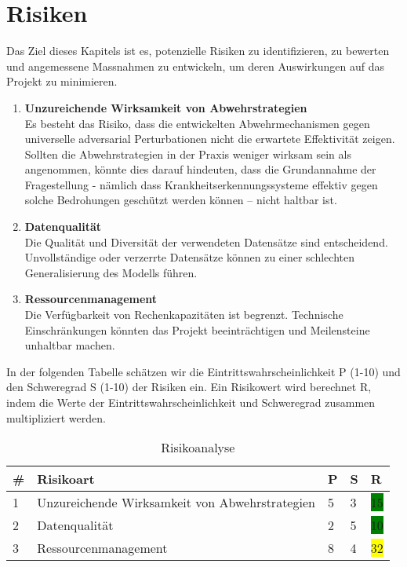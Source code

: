 \section{Risiken}
Das Ziel dieses Kapitels ist es, potenzielle Risiken zu identifizieren, zu bewerten und angemessene Massnahmen zu entwickeln, um deren Auswirkungen auf das Projekt zu minimieren.

\begin{enumerate}
    \item \textbf{Unzureichende Wirksamkeit von Abwehrstrategien} \\ 
    Es besteht das Risiko, dass die entwickelten Abwehrmechanismen gegen universelle adversarial Perturbationen nicht die erwartete Effektivität zeigen. Sollten die Abwehrstrategien in der Praxis weniger wirksam sein als angenommen, könnte dies darauf hindeuten, dass die Grundannahme der Fragestellung - nämlich dass Krankheitserkennungssysteme effektiv gegen solche Bedrohungen geschützt werden können – nicht haltbar ist.

    \item \textbf{Datenqualität} \\
    Die Qualität und Diversität der verwendeten Datensätze sind entscheidend. Unvollständige oder verzerrte Datensätze können zu einer schlechten Generalisierung des Modells führen.
    
    \item \textbf{Ressourcenmanagement} \\
    Die Verfügbarkeit von Rechenkapazitäten ist begrenzt. Technische Einschränkungen könnten das Projekt beeinträchtigen und Meilensteine unhaltbar machen.

\end{enumerate}

In der folgenden Tabelle schätzen wir die Eintrittswahrscheinlichkeit P (1-10) und den Schweregrad S (1-10) der Risiken ein. Ein Risikowert wird berechnet R, indem die Werte der Eintrittswahrscheinlichkeit und Schweregrad zusammen multipliziert werden. 

\begin{table}[ht]
    \centering
    \begin{tabular}{@{}p{0.25cm}p{7cm}p{1cm}p{1cm}p{1cm}@{}}
        \toprule
        \textbf{\#} & \textbf{Risikoart} & \textbf{P} & \textbf{S} & \textbf{R} \\
        \midrule
        1 & Unzureichende Wirksamkeit von Abwehrstrategien & 5 & 3 & \colorbox{green}{15} \\
        \midrule
        2 & Datenqualität & 2 & 5 & \colorbox{green}{10} \\
        \midrule
        3 & Ressourcenmanagement & 8 & 4 & \colorbox{yellow}{32} \\
        \bottomrule
    \end{tabular}
    \caption{Risikoanalyse}
\end{table}


